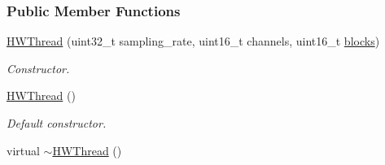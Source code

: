 \subsubsection*{Public Member Functions}
\begin{DoxyCompactItemize}
\item 
\hyperlink{class_h_w_thread_abd12983f14c80f7fdc515c793f40cf5f}{HWThread} (uint32\_\-t sampling\_\-rate, uint16\_\-t channels, uint16\_\-t \hyperlink{class_h_w_thread_abef19c1294d62c789a37e8f1e1af0c97}{blocks})
\begin{DoxyCompactList}\small\item\em Constructor. \item\end{DoxyCompactList}\item 
\hyperlink{class_h_w_thread_a2b7ecb5fc242836db457edba0fcac11e}{HWThread} ()
\begin{DoxyCompactList}\small\item\em Default constructor. \item\end{DoxyCompactList}\item 
\hypertarget{class_h_w_thread_a6eedcb4f3afa48dd5b265a6799a8cf74}{
virtual \hyperlink{class_h_w_thread_a6eedcb4f3afa48dd5b265a6799a8cf74}{$\sim$HWThread} ()}
\label{class_h_w_thread_a6eedcb4f3afa48dd5b265a6799a8cf74}


\end{DoxyCompactItemize}
